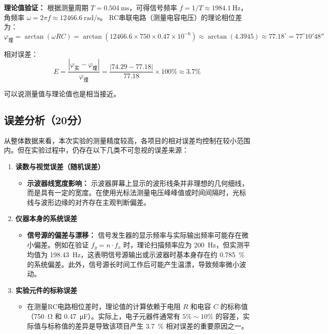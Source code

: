 \documentclass[]{../../templates/Report}%
\begin{document}
\textbf{理论值验证：}
根据测量周期 $T = \SI{0.504}{\ms}$，可得信号频率 $f = 1/T \approx \SI{1984.1}{\hertz}$，角频率 $\omega = 2\pi f \approx \SI{12466.6}{\radian\per\second}$。
RC串联电路（测量电容电压）的理论相位差为：
\[ \varphi_{\text{理}} = \arctan(\omega RC) = \arctan(12466.6 \times 750 \times 0.47 \times 10^{-6}) \approx \arctan(4.3945) \approx 77.18^\circ = 77^\circ 10' 48'' \]

相对误差：
\[ E = \frac{|\varphi_{\text{实}} - \varphi_{\text{理}}|}{\varphi_{\text{理}}} = \frac{|74.29 - 77.18|}{77.18} \times 100\% \approx 3.7\% \]

可以说测量值与理论值也是相当接近。
\subsection{误差分析（20分）}
从整体数据来看，本次实验的测量精度较高，各项目的相对误差均控制在较小范围内。但在实验过程中，仍存在以下几类不可忽视的误差来源：

\begin{enumerate}
    \item \textbf{读数与视觉误差（随机误差）}
    \begin{itemize}
        \item \textbf{示波器线宽度影响：} 示波器屏幕上显示的波形线条并非理想的几何细线，而是具有一定的宽度。在使用光标法测量电压峰峰值或时间间隔时，光标线与波形边缘的对齐存在主观判断偏差。
    \end{itemize}

    \item \textbf{仪器本身的系统误差}
    \begin{itemize}
        \item \textbf{信号源的偏差与漂移：} 信号发生器的显示频率与实际输出频率可能存在微小偏差。例如在验证 $f_y = n \cdot f_x$ 时，理论扫描频率应为 \SI{200}{\hertz}，但实测平均值为 \SI{198.43}{\hertz}，这表明信号源输出或示波器时基本身存在约 \SI{0.785}{\percent} 的系统偏差。此外，信号源长时间工作后可能产生温漂，导致频率微小波动。
    \end{itemize}

    \item \textbf{实验元件的标称误差}
    \begin{itemize}
        \item 在测量RC电路相位差时，理论值的计算依赖于电阻 $R$ 和电容 $C$ 的标称值（\SI{750}{\ohm} 和 \SI{0.47}{\micro\farad}）。实际上，电子元器件通常有 $5\% \sim 10\%$ 的容差，实际值与标称值的差异是导致该项目产生 \SI{3.7}{\percent} 相对误差的重要原因之一。
    \end{itemize}
\end{enumerate}
\end{document}
